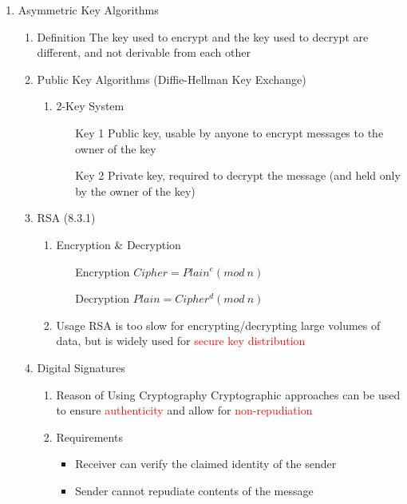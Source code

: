 \documentclass[a4paper,10pt]{article}
\newcommand{\red}[1]{\textcolor{red}{#1}}
\begin{document}
\begin{enumerate}
  \item Asymmetric Key Algorithms
    \begin{enumerate}
      \item Definition
        \newline The key used to encrypt and the key used to decrypt are different, and not derivable from each other
      \item Public Key Algorithms (Diffie-Hellman Key Exchange)
        \begin{enumerate}
          \item 2-Key System
            \begin{itemize}
              \item [Key 1] Public key, usable by anyone to encrypt messages to the owner of the key
              \item [Key 2] Private key, required to decrypt the message (and held only by the owner of the key)
            \end{itemize}
        \end{enumerate}
      \item RSA (8.3.1)
        \begin{enumerate}
          \item Encryption \& Decryption
            \begin{itemize}
              \item [Encryption] $ Cipher = Plain^e(mod\ n) $
              \item [Decryption] $ Plain = Cipher^d(mod\ n) $
            \end{itemize}
          \item Usage
            \newline RSA is too slow for encrypting/decrypting large volumes of data, but is widely used for \red{secure key distribution}
        \end{enumerate}
      \item Digital Signatures
        \begin{enumerate}
          \item Reason of Using Cryptography
            \newline Cryptographic approaches can be used to ensure \red{authenticity} and allow for \red{non-repudiation}
          \item Requirements
            \begin{itemize}
              \item Receiver can verify the claimed identity of the sender
              \item Sender cannot repudiate contents of the message

\end{itemize}
\end{enumerate}
\end{enumerate}
\end{enumerate}
\end{document}
